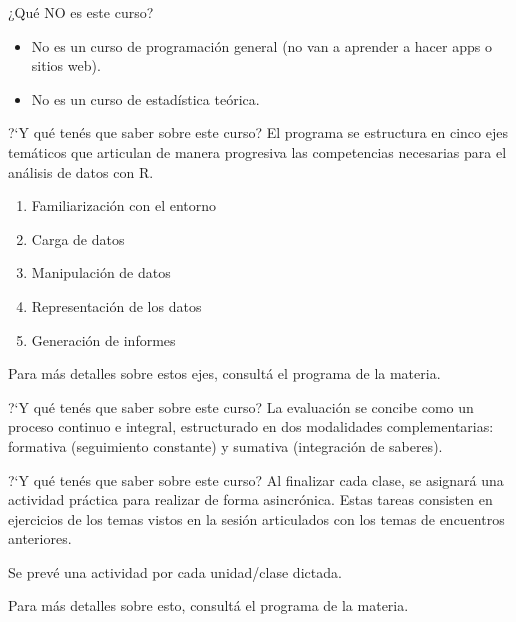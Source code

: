 \documentclass[8pt]{beamer}
\begin{document}
	\begin{frame}[fragile]{¿Qué NO es este curso?}
		\begin{itemize}
			\item No es un curso de programación general (no van a aprender a hacer apps o sitios web).
			\item No es un curso de estadística teórica.
		\end{itemize}
	\end{frame}

	

	
	\begin{frame}[fragile]{?`Y qu\'e ten\'es que saber sobre este curso?}
		El programa se estructura en cinco ejes temáticos que articulan de manera progresiva las com­petencias necesarias para el análisis de datos con R.
		
		\begin{enumerate}
			\item Familiarización con el entorno
			\item Carga de datos
			\item Manipulación de datos
			\item Representación de los datos
			\item Generación de informes
		\end{enumerate}
		
		Para m\'as detalles sobre estos ejes, consult\'a el programa de la materia.
	\end{frame}
	
	
	
	\begin{frame}[fragile]{?`Y qu\'e ten\'es que saber sobre este curso?}
		La evaluación se concibe como un proceso continuo e integral, estructurado en dos modalidades
		complementarias: formativa (seguimiento constante) y sumativa (integración de saberes).
	\end{frame}
	
	\begin{frame}{?`Y qu\'e ten\'es que saber sobre este curso?}
		Al finalizar cada clase, se asignará una actividad práctica para realizar de forma asincrónica. Estas tareas consisten en ejercicios de los temas vistos en la sesión articulados con los temas de encuentros anteriores.
		
		Se prevé una actividad por cada unidad/clase dictada.
		
		Para m\'as detalles sobre esto, consult\'a el programa de la materia.
	\end{frame}
	
\end{document}
